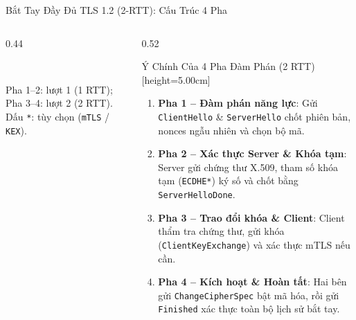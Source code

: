 \documentclass[aspectratio=169, 10pt]{beamer}
\begin{document}
\begin{frame}{Bắt Tay Đầy Đủ TLS 1.2 (2-RTT): Cấu Trúc 4 Pha}
\begin{columns}[T]
\begin{column}{0.44\textwidth}
\begin{uetcard}[height=5.00cm, top=3pt, bottom=3pt, sharp corners, arc=0pt]
\\[1pt]
				{\fontsize{5.2pt}{6.1pt}\selectfont\color{uetgray}Pha 1--2: lượt 1 (1 RTT); Pha 3--4: lượt 2 (2 RTT). Dấu \texttt{*}: tùy chọn (\texttt{mTLS} / \texttt{KEX}).\par}
			\end{uetcard}
		\end{column}

		\begin{column}{0.52\textwidth}
			\begin{accentcard}[uetblue]{Ý Chính Của 4 Pha Đàm Phán (2 RTT)}[height=5.00cm]
				\begin{enumerate}\setlength{\itemsep}{1.2pt}\fontsize{7.2pt}{9.5pt}\selectfont
					\item \textbf{Pha 1 -- Đàm phán năng lực}: Gửi \texttt{ClientHello} \& \texttt{ServerHello} chốt phiên bản, nonces ngẫu nhiên và chọn bộ mã.
					\item \textbf{Pha 2 -- Xác thực Server \& Khóa tạm}: Server gửi chứng thư X.509, tham số khóa tạm (\texttt{ECDHE*}) ký số và chốt bằng \texttt{ServerHelloDone}.
					\item \textbf{Pha 3 -- Trao đổi khóa \& Client}: Client thẩm tra chứng thư, gửi khóa (\texttt{ClientKeyExchange}) và xác thực mTLS nếu cần.
					\item \textbf{Pha 4 -- Kích hoạt \& Hoàn tất}: Hai bên gửi \texttt{ChangeCipherSpec} bật mã hóa, rồi gửi \texttt{Finished} xác thực toàn bộ lịch sử bắt tay.
				\end{enumerate}
			\end{accentcard}
		\end{column}
	\end{columns}
\end{frame}
\end{document}
